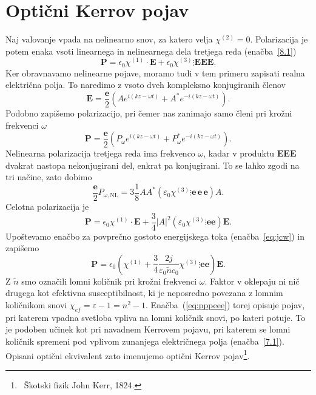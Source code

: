\section{Optični Kerrov pojav}
\label{OKP}
Naj valovanje vpada na nelinearno snov, za katero velja $\chi^{(2)} = 0$.
Polarizacija je potem enaka vsoti linearnega in nelinearnega dela tretjega reda 
(enačba~\ref{8.1})
\begin{equation}
\mathbf{P}=
\epsilon_{0} \chi^{(1)}\cdot \mathbf{E}+
\epsilon_{0}\chi^{(3)}\vdots \mathbin \mathbf{E}\mathbin \mathbf{E}\mathbin\mathbf{E}.
\end{equation}
Ker obravnavamo nelinearne pojave, moramo tudi v tem primeru zapisati realna
električna polja. To naredimo z vsoto dveh kompleksno konjugiranih členov
\begin{equation}
\mathbf{E}=\frac{\mathbf{e}}{2}\left(Ae^{i(kz-\omega t)}+A^{*}e^{-i(kz-\omega t)}\right)\!.
\label{8.71}
\end{equation}
Podobno zapišemo polarizacijo, pri čemer nas zanimajo samo členi pri krožni frekvenci $\omega$
\begin{equation}
\mathbf{P}=\frac{\mathbf{e}}{2}\left(P_\omega e^{i(kz-\omega t)}+P_\omega^{*}e^{-i(kz-\omega t)}\right)\!.
\label{8.71a}
\end{equation}
Nelinearna polarizacija tretjega reda ima frekvenco $\omega$, kadar v produktu 
$\mathbf{E}\mathbin \mathbf{E}\mathbin\mathbf{E}$ 
dvakrat nastopa nekonjugirani del, enkrat pa konjugirani. To se lahko zgodi na tri
načine, zato dobimo
\begin{equation}
\frac{\mathbf{e}}{2}P_{\omega,\mathrm{NL}} = 3 \frac{1}{8} A A^* \left( 
\varepsilon_0 \chi^{(3)}\vdots \mathbf{e}\, \mathbf{e} \, \mathbf{e} \right) A.
\label{pomega}
\end{equation}
Celotna polarizacija je
\begin{equation}
\mathbf{P}=
\epsilon_{0} \chi^{(1)}\cdot \mathbf{E}+\frac{3}{4} |A|^2 \left( 
\varepsilon_0 \chi^{(3)}\vdots \mathbin \mathbf{e}\mathbin \mathbf{e} \right) \mathbf{E}.
\label{eq:ptnl}
\end{equation}
Upoštevamo enačbo za povprečno gostoto energijskega toka (enačba~\ref{eq:jcw}) in
zapišemo
\begin{equation}
\mathbf{P}=
\epsilon_{0} \left( \chi^{(1)} +\frac{3}{4} \frac{2  j }
{\varepsilon_0 \tilde{n} c_0} \chi^{(3)}\vdots \mathbin \mathbf{e}\mathbin 
\mathbf{e} \right) \mathbf{E}.
\label{eq:pppeee}
\end{equation}
Z $\tilde{n}$ smo označili lomni količnik pri krožni frekvenci $\omega$. 
Faktor v oklepaju ni nič drugega kot efektivna susceptibilnost, ki je neposredno povezana
z lomnim količnikom snovi $\chi_{ef} = \varepsilon -1 =n^2 -1$. Enačba~(\ref{eq:pppeee}) 
torej opisuje pojav, 
pri katerem vpadna svetloba vpliva na lomni količnik snovi, po kateri 
potuje.
To je podoben učinek kot pri navadnem Kerrovem pojavu, pri katerem se lomni količnik 
spremeni pod vplivom zunanjega električnega polja (enačba~\ref{7.1}).
Opisani optični ekvivalent zato imenujemo optični 
Kerrov pojav\footnote{~Škotski fizik John Kerr, 1824.}.

